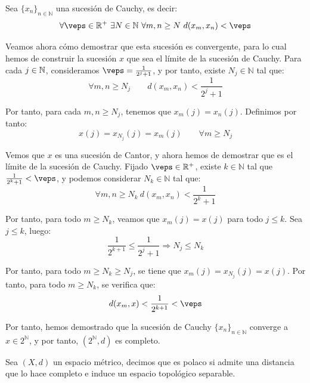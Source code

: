 \begin{ejercicio}
    Sea $\{x_n\}_{n\in \mathbb{N}}$ una sucesión de Cauchy, es decir:
    \begin{equation*}
        \forall \veps\in \mathbb{R}^+\ \exists N\in \mathbb{N}\ \forall m,n\geq N\ d(x_m,x_n) < \veps
    \end{equation*}

    Veamos ahora cómo demostrar que esta sucesión es convergente, para lo cual hemos de construir la sucesión $x$ que sea el límite de la sucesión de Cauchy. Para cada $j\in \mathbb{N}$, consideramos $\veps=\frac{1}{2^j+1}$, y por tanto, existe $N_j\in \mathbb{N}$ tal que:
    \begin{equation*}
        \forall m,n\geq N_j\qquad d(x_m,x_n) < \frac{1}{2^j+1}
    \end{equation*}

    Por tanto, para cada $m,n\geq N_j$, tenemos que $x_m(j)=x_n(j)$. Definimos por tanto:
    \begin{equation*}
        x(j) = x_{N_j}(j) = x_m(j) \qquad \forall m\geq N_j
    \end{equation*}

    Vemos que $x$ es una sucesión de Cantor, y ahora hemos de demostrar que es el límite de la sucesión de Cauchy. Fijado $\veps\in \mathbb{R}^+$, existe $k\in \mathbb{N}$ tal que $\frac{1}{2^k+1} < \veps$, y podemos considerar $N_k\in \mathbb{N}$ tal que:
    \begin{equation*}
        \forall m,n\geq N_k\ d(x_m,x_n) < \frac{1}{2^k+1}
    \end{equation*}

    Por tanto, para todo $m\geq N_k$, veamos que $x_m(j) = x(j)$ para todo $j\leq k$. Sea $j\leq k$, luego:
    \begin{equation*}
        \frac{1}{2^{k+1}}\leq \frac{1}{2^j+1}\Longrightarrow N_j\leq N_k
    \end{equation*}

    Por tanto, para todo $m\geq N_k\geq N_j$, se tiene que $x_m(j) = x_{N_j}(j) = x(j)$. Por tanto, para todo $m\geq N_k$, se verifica que:
    \begin{equation*}
        d(x_m,x) < \frac{1}{2^{k+1}} < \veps
    \end{equation*}

    Por tanto, hemos demostrado que la sucesión de Cauchy $\{x_n\}_{n\in \mathbb{N}}$ converge a $x\in 2^\mathbb{N}$, y por tanto, $(2^\mathbb{N},d)$ es completo.
\end{ejercicio}

\begin{definicion}[Polaco]
    Sea $(X,d)$ un espacio métrico, decimos que es polaco si admite una distancia que lo hace completo e induce un espacio topológico separable.
\end{definicion}

